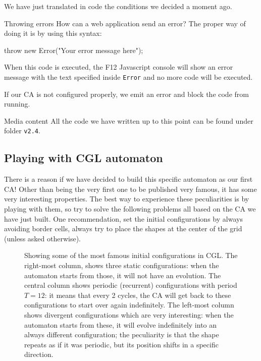 We have just translated in code the conditions we decided a moment ago.

\begin{tips}{Throwing errors}
How can a web application send an error? The proper way of doing it is by using this syntax:
\begin{code}
throw new Error("Your error message here");
\end{code}
When this code is executed, the F12 Javascript console will show an error message with the text
specified inside \texttt{Error} and no more code will be executed.
\end{tips}

If our CA is not configured properly, we emit an error and block the code from running.

\begin{trailer}{Media content}
All the code we have written up to this point can be found under folder \texttt{v2.4}.
\end{trailer}

\subsection{Playing with CGL automaton}
There is a reason if we have decided to build this specific automaton as our first CA! Other than being
the very first one to be published very famous, it has some very interesting properties.
The best way to experience these peculiarities is by playing with them, so try to
solve the following problems all based on the CA we have just built. One recommendation,
set the initial configurations by always avoiding border cells, always try to place
the shapes at the center of the grid (unless asked otherwise).

%
\begin{figure}[b]
\sidecaption

%
%
\caption{Showing some of the most famous initial configurations in CGL.
The right-most column, shows three static configurations: when the automaton starts from those,
it will not have an evolution.
The central column shows periodic (recurrent) configurations with period $T=12$: it means that every
2 cycles, the CA will get back to these configurations to start over again indefinitely.
The left-most column shows divergent configurations which are very interesting: when the
automaton starts from these, it will evolve indefinitely into an always different configuration; the
peculiarity is that the shape repeats as if it was periodic, but its position shifts in a
specific direction.}
\label{fig:cglplay}
\end{figure}
%

